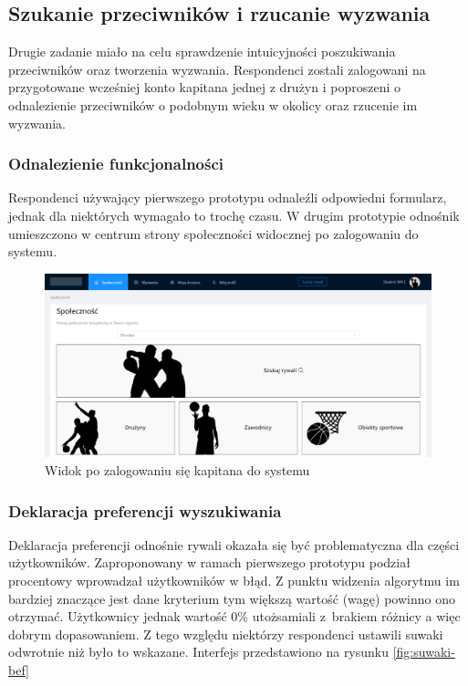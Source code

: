 \subsection{Szukanie przeciwników i rzucanie wyzwania}

Drugie zadanie miało na celu sprawdzenie intuicyjności poszukiwania przeciwników oraz tworzenia wyzwania. Respondenci zostali zalogowani na przygotowane wcześniej konto kapitana jednej z drużyn i poproszeni o odnalezienie przeciwników o podobnym wieku w okolicy oraz rzucenie im wyzwania.

\subsubsection{Odnalezienie funkcjonalności}

Respondenci używający pierwszego prototypu odnaleźli odpowiedni formularz, jednak dla niektórych wymagało to trochę czasu. W drugim prototypie odnośnik umieszczono w centrum strony społeczności widocznej po zalogowaniu do systemu.

\begin{figure}[H]
\centering
\includegraphics[width=\linewidth]{07-walidacja/rys/spolecznosc.PNG}
\caption{Widok po zalogowaniu się kapitana do systemu}
\label{fig:view-player-skill}
\end{figure}

\subsubsection{Deklaracja preferencji wyszukiwania}

Deklaracja preferencji odnośnie rywali okazała się być problematyczna dla części użytkowników. Zaproponowany w ramach pierwszego prototypu podział procentowy wprowadzał użytkowników w błąd. Z punktu widzenia algorytmu im bardziej znaczące jest dane kryterium tym większą wartość (wagę) powinno ono otrzymać. Użytkownicy jednak wartość 0\% utożsamiali z~brakiem różnicy a więc dobrym dopasowaniem. Z tego względu niektórzy respondenci ustawili suwaki odwrotnie niż było to wskazane. Interfejs przedstawiono na rysunku \ref{fig:suwaki-bef}


